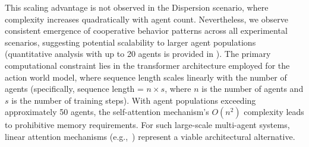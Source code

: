 This scaling advantage is not observed in the Dispersion scenario, where complexity increases quadratically with agent count. Nevertheless, we observe consistent emergence of cooperative behavior patterns across all experimental scenarios, suggesting potential scalability to larger agent populations (quantitative analysis with up to 20 agents is provided in ). The primary computational constraint lies in the transformer architecture employed for the action world model, where sequence length scales linearly with the number of agents (specifically, sequence length = $n \times s$, where $n$ is the number of agents and $s$ is the number of training steps). With agent populations exceeding approximately 50 agents, the self-attention mechanism's $O(n^2)$ complexity leads to prohibitive memory requirements. For such large-scale multi-agent systems, linear attention mechanisms (e.g.,~\cite{Beltagy20}) represent a viable architectural alternative.


